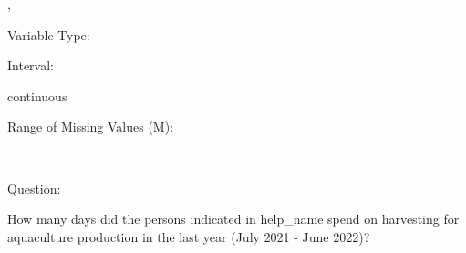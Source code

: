 \documentclass[
]{article}
\begin{document}
,

\begin{minipage}[t]{0.3\linewidth}

\colorbox{mypink1}{}

\end{minipage}%
\begin{minipage}[t]{0.7\linewidth}

\colorbox{mypink1}{\makebox[\textwidth]{\strut\bfseries\color{black}  
 }}

\end{minipage}

\begin{minipage}[t]{0.3\linewidth}

Variable Type:

\end{minipage}%
\begin{minipage}[t]{0.7\linewidth}

\end{minipage}

\begin{minipage}[t]{0.3\linewidth}

Interval:

\end{minipage}%
\begin{minipage}[t]{0.7\linewidth}

continuous

\end{minipage}

\begin{minipage}[t]{0.3\linewidth}

Range of Missing Values (M):

\end{minipage}%
\begin{minipage}[t]{0.7\linewidth}

~

\end{minipage}

\begin{minipage}[t]{0.3\linewidth}

Question:

\end{minipage}%
\begin{minipage}[t]{0.7\linewidth}

How many days did the persons indicated in help\_name spend on
harvesting for aquaculture production in the last year (July 2021 - June
2022)?

\end{minipage}
\end{document}
